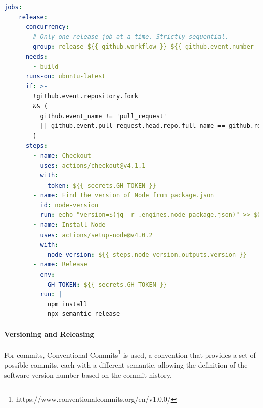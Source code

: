 \documentclass[12pt,a4paper,openright,twoside]{book}
\begin{document}
\begin{lstlisting}[language=yaml, label={lst:ci-release}, caption={CI/CD workflow: release job.}]
  jobs:
    release:
      concurrency:
        # Only one release job at a time. Strictly sequential.
        group: release-${{ github.workflow }}-${{ github.event.number || github.ref }}
      needs:
        - build
      runs-on: ubuntu-latest
      if: >-
        !github.event.repository.fork
        && (
          github.event_name != 'pull_request'
          || github.event.pull_request.head.repo.full_name == github.repository
        )
      steps:
        - name: Checkout
          uses: actions/checkout@v4.1.1
          with:
            token: ${{ secrets.GH_TOKEN }}
        - name: Find the version of Node from package.json
          id: node-version
          run: echo "version=$(jq -r .engines.node package.json)" >> $GITHUB_OUTPUT
        - name: Install Node
          uses: actions/setup-node@v4.0.2
          with:
            node-version: ${{ steps.node-version.outputs.version }}
        - name: Release
          env:
            GH_TOKEN: ${{ secrets.GH_TOKEN }}
          run: |
            npm install
            npx semantic-release
  \end{lstlisting}

\paragraph*{Versioning and Releasing}
For commits, Conventional Commits\footnote{https://www.conventionalcommits.org/en/v1.0.0/} is used, a convention that provides a set of possible commits, 
each with a different semantic, allowing the definition of the software version number based on the commit history.
\end{document}
